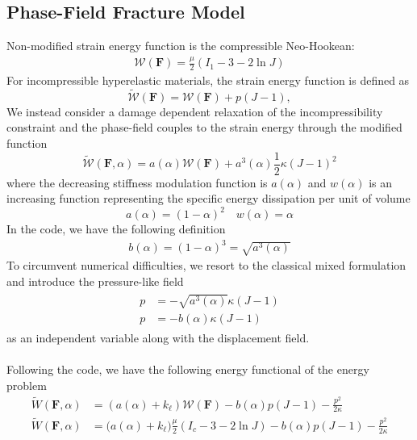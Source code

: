 \documentclass[12pt,3p]{article}
\numberwithin{equation}{section}
\begin{document}
\subsection{Phase-Field Fracture Model}
Non-modified strain energy function is the compressible Neo-Hookean:
\begin{align}\label{StrainEnergyNH}
\mathcal{W}(\mathbf{F}) = \frac{\mu}{2} (I_1 - 3 - 2 \ln J)
\end{align}
For incompressible hyperelastic materials, the strain energy function  is defined as
\begin{equation}\label{EqEnergyIncompressible}
\widetilde{\mathcal{W}}(\mathbf{F}) = \mathcal{W}(\mathbf{F}) + p\left(J-1\right),
\end{equation}
We instead consider a damage dependent relaxation of the incompressibility constraint and the phase-field couples to the strain energy through the modified function 
\begin{equation}\label{EqEnergyRelaxed}
\widetilde{\mathcal{W}}(\mathbf{F},\alpha) = a(\alpha)\mathcal{W}(\mathbf{F}) + a^3(\alpha)\frac{1}{2}\kappa\left(J-1\right)^2
\end{equation}
where the decreasing stiffness modulation function is $a (\alpha)$ and $w(\alpha)$ is an increasing function representing the specific energy dissipation per unit of volume
\begin{equation}\label{EqStiffMod}
a (\alpha) = (1 - \alpha)^2 \quad w(\alpha) = \alpha
\end{equation}
In the code, we have the following definition
\begin{align*}
b (\alpha) = (1 - \alpha)^3 = \sqrt{a^3(\alpha)}
\end{align*}
To circumvent numerical difficulties, we resort to the classical mixed formulation and introduce the pressure-like field 
\begin{align}\label{eq_pressure}
\begin{split}
p &= -\sqrt{a^3(\alpha)}\kappa\left(J-1\right) \\ 
p &= - b(\alpha) \kappa \left(J-1\right) 
\end{split}
\end{align}
as an independent variable along with the displacement field. \\ \\
Following the code, we have the following energy functional of the energy problem
\begin{align*}
\widetilde{W} (\mathbf{F}, \alpha) &= (a(\alpha) + k_\ell) \mathcal{W} (\mathbf{F}) - b(\alpha) p (J-1) - \frac{p^2}{2 \kappa} \\
\widetilde{W} (\mathbf{F}, \alpha) &= \big( a(\alpha) + k_\ell) \frac{\mu}{2} (I_c - 3 - 2 \ln J) - b(\alpha) p (J-1) - \frac{p^2}{2 \kappa}
\end{align*}
\end{document}
